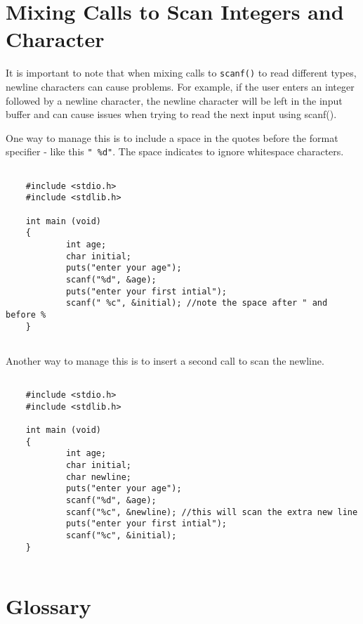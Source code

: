\section{Mixing Calls to Scan Integers and Character}
It is important to note that when mixing calls to {\tt scanf()} to read different types, newline characters can cause problems. 
For example, if the user enters an integer followed by a newline character, the newline character will be 
left in the input buffer and can cause issues when trying to read the next input using scanf(). 

One way to manage this is to include a space in the quotes before the format specifier - like this {\tt " \%d"}. 
The space indicates to ignore whitespace characters.

\begin{verbatim}
	
	#include <stdio.h>
	#include <stdlib.h>
	
	int main (void)
	{
			int age;
			char initial;
			puts("enter your age");
			scanf("%d", &age);
			puts("enter your first intial");
			scanf(" %c", &initial); //note the space after " and before %
	}
	
\end{verbatim}
%
 Another way to manage this is to insert a second call to scan the newline.

\begin{verbatim}
	
	#include <stdio.h>
	#include <stdlib.h>
	
	int main (void)
	{
			int age;
			char initial;
			char newline;
   			puts("enter your age");
			scanf("%d", &age);
			scanf("%c", &newline); //this will scan the extra new line
			puts("enter your first intial");
			scanf("%c", &initial); 
	}
	
\end{verbatim}
%

\section{Glossary}

